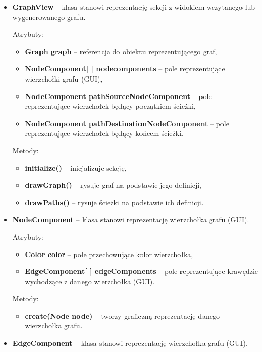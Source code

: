 \documentclass{article}
\begin{document}
\begin{itemize}
\newpage
    
    \item \textbf{GraphView} -- klasa stanowi reprezentację sekcji z widokiem wczytanego lub wygenerowanego grafu.
    
    Atrybuty:
    \begin{itemize}
        \item \textbf{Graph graph} -- referencja do obiektu reprezentującego graf,
        \item \textbf{NodeComponent[ ] nodecomponents} -- pole reprezentujące wierzchołki grafu (GUI),
        \item \textbf{NodeComponent pathSourceNodeComponent} -- pole reprezentujące wierzchołek będący początkiem ścieżki,
        \item \textbf{NodeComponent pathDestinationNodeComponent} -- pole reprezentujące wierzchołek będący końcem ścieżki.
    \end{itemize}
    
    Metody:
    \begin{itemize}
        \item \textbf{initialize()} -- inicjalizuje sekcję,
        \item \textbf{drawGraph()} -- rysuje graf na podstawie jego definicji,
        \item \textbf{drawPaths()} -- rysuje ścieżki na podstawie ich definicji.
    \end{itemize}
    
    \item \textbf{NodeComponent} -- klasa stanowi reprezentację wierzchołka grafu (GUI).
    
    Atrybuty:
    \begin{itemize}
        \item \textbf{Color color} -- pole przechowujące kolor wierzchołka,
        \item \textbf{EdgeComponent[ ] edgeComponents} -- pole reprezentujące krawędzie wychodzące z danego wierzchołka (GUI).
    \end{itemize}
    
    Metody:
    \begin{itemize}
        \item \textbf{create(Node node)} -- tworzy graficzną reprezentację danego wierzchołka grafu.
    \end{itemize}
    
    \item \textbf{EdgeComponent} -- klasa stanowi reprezentację wierzchołka grafu (GUI).
    

\end{itemize}
\end{document}

